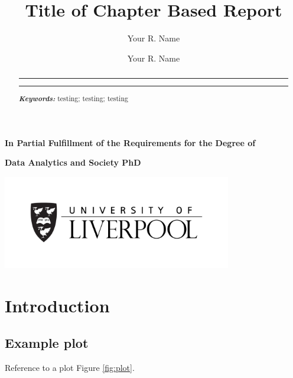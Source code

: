 \documentclass[a4paper, notitlepage]{extreport}
\title{Title of Chapter Based Report}
\author{Your R. Name}
\renewcommand*{\tableofcontents}{\listoftoc[{\contentsname}]{toc}}%
\providecommand{\keywords}[1]{\footnotesize\textbf{\textit{Keywords:}} #1}
\newcommand{\copyrightfont}{\linespread{1}\normalfont\rmfamily\fontsize{7}{8}\selectfont}
\begin{document}

    \maketitle

{\copyrightfont\author{Your R. Name}}

\date{}
    \thispagestyle{empty}
    \vskip 50pt
  \begin{abstract}
      \centering\begin{minipage}{\dimexpr\paperwidth-10cm}
          \hrule
          \vskip 5pt
    \lipsum[1-1]
    \vskip 5pt
    \hrule
    \vskip 10pt
\keywords{testing; testing; testing}
\end{minipage}
  \end{abstract}

\vskip 12pt

{\copyrightfont\centerline{\bfseries In Partial Fulfillment of the Requirements for the Degree of}}
{\copyrightfont\centerline{\bfseries Data Analytics and Society PhD}}
\centerline{\includegraphics[width = 100mm]{./template/uolLogo.png}}
\newpage

\tableofcontents

\listoffigures

\listoftables

\newpage


\hypertarget{introduction}{%
\chapter{Introduction}\label{introduction}}

\lipsum[1-2]

\hypertarget{example-plot}{%
\section{Example plot}\label{example-plot}}

Reference to a plot Figure \ref{fig:plot}.

\lipsum[1-1]
\end{document}
